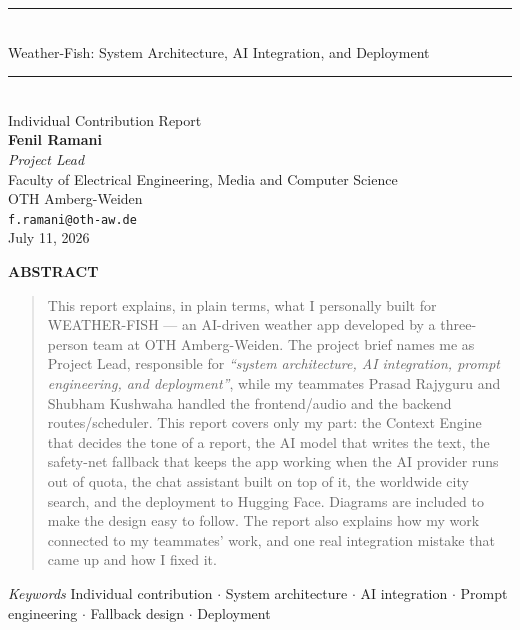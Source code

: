 \documentclass[11pt, a4paper]{article}
\renewenvironment{abstract}{%
  \small\begin{center}\textbf{A\footnotesize BSTRACT}\end{center}%
  \begin{quotation}
}{%
  \end{quotation}
}
\begin{document}
\justifying

\begin{center}
  \rule{\linewidth}{1.5pt}\\[6pt]
  {\Large\sc Weather-Fish: System Architecture, AI Integration, and Deployment}\\[4pt]
  \rule{\linewidth}{0.6pt}\\[6pt]
  {\small\sc Individual Contribution Report}\\[12pt]

  \textbf{Fenil Ramani}\\[2pt]
  \textit{Project Lead}\\[4pt]
  Faculty of Electrical Engineering, Media and Computer Science\\
  OTH Amberg-Weiden\\
  \texttt{f.ramani@oth-aw.de}\\[10pt]
  July 11, 2026
\end{center}

\vspace{6pt}

\begin{abstract}
This report explains, in plain terms, what I personally built for WEATHER-FISH --- an
AI-driven weather app developed by a three-person team at OTH Amberg-Weiden. The project
brief names me as Project Lead, responsible for \textit{``system architecture, AI
integration, prompt engineering, and deployment''}, while my teammates Prasad Rajyguru
and Shubham Kushwaha handled the frontend/audio and the backend routes/scheduler. This
report covers only my part: the Context Engine that decides the tone of a report, the AI
model that writes the text, the safety-net fallback that keeps the app working when the AI
provider runs out of quota, the chat assistant built on top of it, the worldwide city
search, and the deployment to Hugging Face. Diagrams are included to make the design easy
to follow. The report also explains how my work connected to my teammates' work, and one
real integration mistake that came up and how I fixed it.
\end{abstract}

\vspace{2pt}
\noindent\textit{Keywords}\quad
Individual contribution $\cdot$ System architecture $\cdot$ AI integration $\cdot$
Prompt engineering $\cdot$ Fallback design $\cdot$ Deployment

\bigskip
\end{document}
